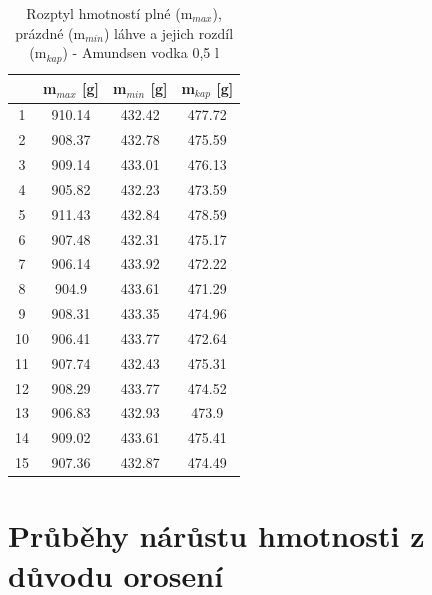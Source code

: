 \begin{table}[h]
    \centering
    \begin{tabular}{|c|c|c|c|}
        \hline
         & \textbf{m$_{max}$ [g]} & \textbf{m$_{min}$ [g]} & \textbf{m$_{kap}$ [g]} \\ \hline \hline
        1 & 910.14 & 432.42 & 477.72 \\ \hline
        2 & 908.37 & 432.78 & 475.59 \\ \hline
        3 & 909.14 & 433.01 & 476.13 \\ \hline
        4 & 905.82 & 432.23 & 473.59 \\ \hline
        5 & 911.43 & 432.84 & 478.59 \\ \hline
        6 & 907.48 & 432.31 & 475.17 \\ \hline
        7 & 906.14 & 433.92 & 472.22 \\ \hline
        8 & 904.9 & 433.61 & 471.29 \\ \hline
        9 & 908.31 & 433.35 & 474.96 \\ \hline
        10 & 906.41 & 433.77 & 472.64 \\ \hline
        11 & 907.74 & 432.43 & 475.31 \\ \hline
        12 & 908.29 & 433.77 & 474.52 \\ \hline
        13 & 906.83 & 432.93 & 473.9 \\ \hline
        14 & 909.02 & 433.61 & 475.41 \\ \hline
        15 & 907.36 & 432.87 & 474.49 \\ \hline
    \end{tabular}
    \caption{Rozptyl hmotností plné (m$_{max}$), prázdné (m$_{min}$) láhve a jejich rozdíl (m$_{kap}$) - Amundsen vodka 0,5 l}
    \label{tab:placeholder_label}
\end{table}


\section{Průběhy nárůstu hmotnosti z důvodu orosení}

